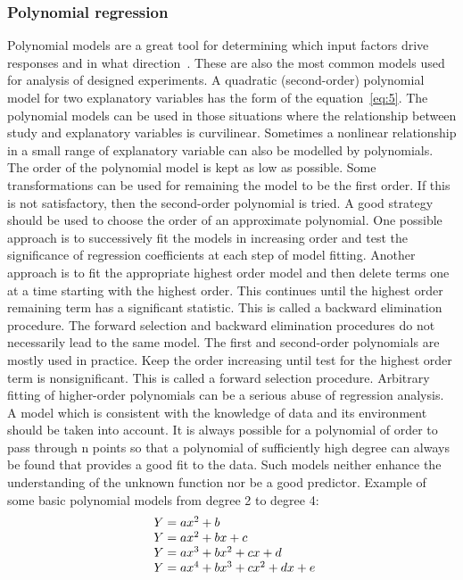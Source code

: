\subsubsection{Polynomial regression} \label{sec:poly}
Polynomial models are a great tool for determining which input factors drive responses and in what direction~\cite{poly}.
These are also the most common models used for analysis of designed experiments.
A quadratic (second-order) polynomial model for two explanatory variables has the form of the equation~\ref{eq:5}.
The polynomial models can be used in those situations where the relationship between study and explanatory variables is curvilinear.
Sometimes a nonlinear relationship in a small range of explanatory variable can also be modelled by polynomials.
The order of the polynomial model is kept as low as possible.
Some transformations can be used for remaining the model to be the first order.
If this is not satisfactory, then the second-order polynomial is tried.
A good strategy should be used to choose the order of an approximate polynomial.
One possible approach is to successively fit the models in increasing order and test the significance of regression coefficients at each step of model fitting.
Another approach is to fit the appropriate highest order model and then delete terms one at a time starting with the highest order.
This continues until the highest order remaining term has a significant statistic.
This is called a backward elimination procedure.
The forward selection and backward elimination procedures do not necessarily lead to the same model.
The first and second-order polynomials are mostly used in practice.
Keep the order increasing until test for the highest order term is nonsignificant.
This is called a forward selection procedure.
Arbitrary fitting of higher-order polynomials can be a serious abuse of regression analysis.
A model which is consistent with the knowledge of data and its environment should be taken into account.
It is always possible for a polynomial of order to pass through n points so that a polynomial of sufficiently high degree can always be found that provides a good fit to the data.
Such models neither enhance the understanding of the unknown function nor be a good predictor.
Example of some basic polynomial models from degree 2 to degree 4:\\
\begin{equation} \label{eq:5}
\begin{array}{l@{}l}
	Y = ax^2 + b\\
	Y = ax^2 + bx + c\\
	Y = ax^3 + bx^2 + cx + d\\
	Y = ax^4 + bx^3 + cx^2 + dx + e\\
\end{array}
\end{equation}

